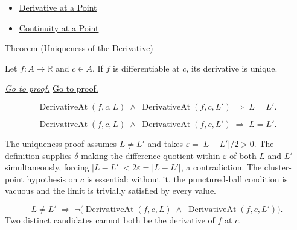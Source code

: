 \begin{dependencies}
\begin{itemize}
  \item \hyperref[def:derivative-at-a-point]{Derivative at a Point}
  \item \hyperref[def:continuous-at-point]{Continuity at a Point}
\end{itemize}
\end{dependencies}


\begin{theorembox}{Theorem (Uniqueness of the Derivative)}
\begin{theorem}
\label{thm:uniqueness-of-the-derivative}
Let $f : A \to \mathbb{R}$ and $c \in A$. If $f$ is differentiable at $c$, its derivative is unique.

\smallskip\noindent
\hyperref[prf:uniqueness-of-derivative]{\textit{Go to proof.}}
\hyperref[prf:uniqueness-of-the-derivative]{Go to proof.}
\end{theorem}
\end{theorembox}

\begin{remark*}
\[
\operatorname{DerivativeAt}(f,c,L) \;\land\; \operatorname{DerivativeAt}(f,c,L')
\;\Rightarrow\; L = L'.
\]
\end{remark*}

\begin{remark*}
\[
\operatorname{DerivativeAt}(f,c,L)
\;\land\;
\operatorname{DerivativeAt}(f,c,L')
\;\Longrightarrow\; L = L'.
\]
\end{remark*}

\begin{remark*}
The uniqueness proof assumes $L \neq L'$ and takes $\varepsilon = |L - L'|/2 > 0$. The definition supplies $\delta$ making the difference quotient within $\varepsilon$ of both $L$ and $L'$ simultaneously, forcing $|L - L'| < 2\varepsilon = |L - L'|$, a contradiction. The cluster-point hypothesis on $c$ is essential: without it, the punctured-ball condition is vacuous and the limit is trivially satisfied by every value.
\end{remark*}

\begin{remark*}
\[
L \neq L' \;\Rightarrow\; \neg\bigl(\operatorname{DerivativeAt}(f,c,L) \;\land\; \operatorname{DerivativeAt}(f,c,L')\bigr).
\]
Two distinct candidates cannot both be the derivative of $f$ at $c$.
\end{remark*}

